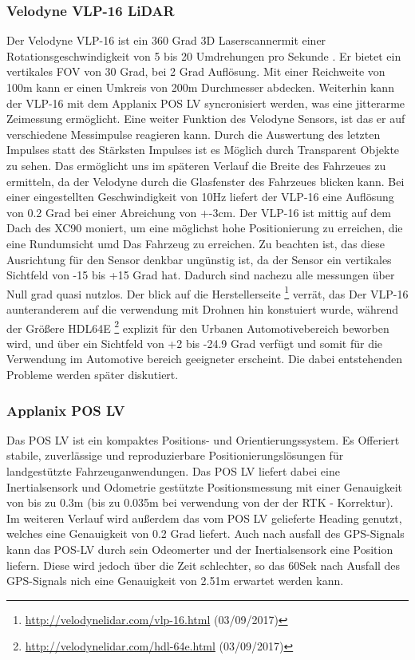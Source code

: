 \subsubsection{Velodyne VLP-16 LiDAR}
Der Velodyne VLP-16 ist ein 360 Grad 3D Laserscannermit einer Rotationsgeschwindigkeit von 5 bis 20 Umdrehungen pro Sekunde \cite{manVEL}. Er bietet ein vertikales FOV von 30 Grad, bei 2 Grad Auflösung.
Mit einer Reichweite von 100m kann er einen Umkreis von 200m Durchmesser abdecken. Weiterhin kann der VLP-16 mit dem Applanix POS LV syncronisiert werden, was eine jitterarme Zeimessung ermöglicht.
Eine weiter Funktion des Velodyne Sensors, ist das er auf verschiedene Messimpulse reagieren kann. Durch die Auswertung des letzten Impulses statt des Stärksten Impulses ist es Möglich durch Transparent Objekte zu sehen.
Das ermöglicht uns im späteren Verlauf die Breite des Fahrzeues zu ermitteln, da der Velodyne durch die Glasfenster des Fahrzeues blicken kann.
Bei einer eingestellten Geschwindigkeit von 10Hz liefert der VLP-16 eine Auflösung von 0.2 Grad bei einer Abreichung von +-3cm. Der VLP-16 ist mittig auf dem Dach des XC90 moniert, um eine möglichst hohe Positionierung
zu erreichen, die eine Rundumsicht umd Das Fahrzeug zu erreichen. Zu beachten ist, das diese Ausrichtung für den Sensor denkbar ungünstig ist, da der Sensor ein vertikales
Sichtfeld von -15 bis +15 Grad hat. Dadurch sind nachezu alle messungen über Null grad quasi nutzlos. Der blick auf die Herstellerseite
\footnote{\url{http://velodynelidar.com/vlp-16.html} (03/09/2017)}
verrät, das Der VLP-16 aunteranderem auf die verwendung mit Drohnen hin konstuiert wurde, während der Größere HDL64E
\footnote{\url{http://velodynelidar.com/hdl-64e.html} (03/09/2017)}
explizit für den Urbanen Automotivebereich beworben wird, und über ein Sichtfeld von +2 bis -24.9 Grad verfügt und somit für die Verwendung im
Automotive bereich geeigneter erscheint. Die dabei entstehenden Probleme werden später diskutiert.



\subsubsection{Applanix POS LV}
Das POS LV ist ein kompaktes Positions- und Orientierungssystem. Es Offeriert stabile, zuverlässige und reproduzierbare Positionierungslösungen für landgestützte Fahrzeuganwendungen.
Das POS LV liefert dabei eine Inertialsensork und Odometrie gestützte Positionsmessung mit einer Genauigkeit von bis zu 0.3m (bis zu 0.035m bei verwendung von der der RTK - Korrektur).
Im weiteren Verlauf wird außerdem das vom POS LV gelieferte Heading genutzt, welches eine Genauigkeit von 0.2 Grad liefert. Auch nach ausfall des GPS-Signals kann das POS-LV durch sein
Odeomerter und der Inertialsensork eine Position liefern. Diese wird jedoch über die Zeit schlechter, so das 60Sek nach Ausfall des GPS-Signals nich eine Genauigkeit von 2.51m erwartet
werden kann.\cite{manAP}


